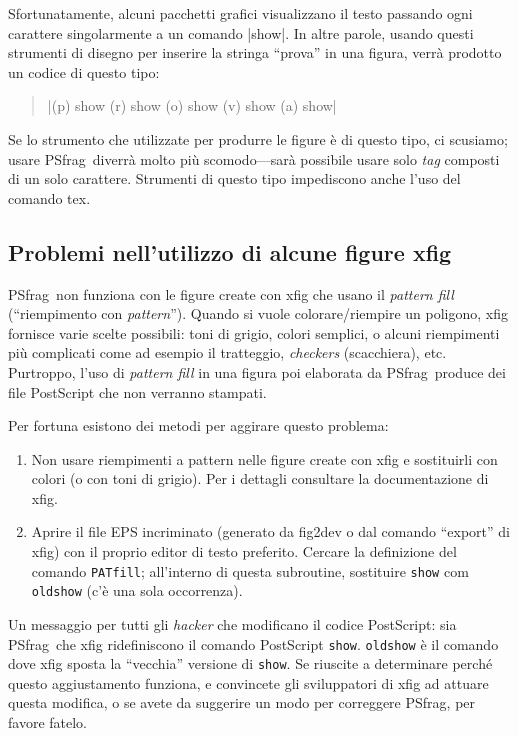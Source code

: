 \documentclass[a4paper,11pt]{ltxguide}
\let\pkg\textsf
\let\pscom\texttt
\newcommand{\pfg}{\pkg{PSfrag}}
\def\cs#1{%
  {\ttfamily\expandafter\string\csname #1\endcsname}}
\begin{document}
Sfortunatamente, alcuni pacchetti grafici visualizzano il testo passando ogni carattere
singolarmente a un comando |show|. In altre parole, usando questi strumenti di disegno
per inserire la stringa ``prova'' in una figura, verr\`a prodotto un codice di questo tipo:
\begin{quote}
        |(p) show (r) show (o) show (v) show (a) show|
\end{quote}
Se lo strumento che utilizzate per produrre le figure \`e di questo tipo,
ci scusiamo; usare \pfg\ diverr\`a molto pi\`u scomodo---sar\`a
possibile usare solo \emph{tag} composti di un solo carattere. Strumenti di questo
tipo impediscono anche l'uso del comando \cs{tex}.
\subsection{Problemi nell'utilizzo di alcune figure \pkg{xfig}}

\pfg\ non funziona con le figure create con \pkg{xfig} che usano il 
 \emph{pattern fill} (``riempimento con \emph{pattern}'').
Quando si vuole colorare/riempire un poligono, \pkg{xfig} 
fornisce varie scelte possibili: 
toni di grigio, colori semplici, o alcuni riempimenti pi\`u 
complicati come ad esempio il tratteggio, \emph{checkers} (scacchiera),
etc. Purtroppo, l'uso di \emph{pattern fill} in una figura
 poi elaborata da \pfg\ 
produce dei file PostScript che non verranno stampati.

Per fortuna esistono dei metodi per aggirare questo problema:
\begin{enumerate}
        \item Non usare riempimenti a pattern nelle figure create 
        con \pkg{xfig}
        e sostituirli con colori (o con toni di grigio). 
                  Per i dettagli consultare la documentazione di \pkg{xfig}.
     
        \item Aprire il file EPS incriminato (generato da 
        \pkg{fig2dev}  o dal comando ``export'' di \pkg{xfig}) 
                con il proprio editor di testo  preferito.
                Cercare la definizione del comando \pscom{PATfill}; 
                all'interno di questa 
                subroutine, sostituire \pscom{show} com \pscom{oldshow} 
                (c'\`e una sola occorrenza).
\end{enumerate}
Un messaggio per tutti gli \emph{hacker} che modificano il codice PostScript: 
sia \pfg\ che \pkg{xfig} ridefiniscono il comando  PostScript \pscom{show}.
\pscom{oldshow} \`e il comando dove \pkg{xfig} sposta la 
``vecchia'' versione di \pscom{show}. Se riuscite a determinare
 perch\'e questo aggiustamento funziona, e convincete gli sviluppatori 
di \pkg{xfig} ad attuare questa modifica,
o se avete da suggerire un modo per correggere \pfg, per favore fatelo.
\end{document}
